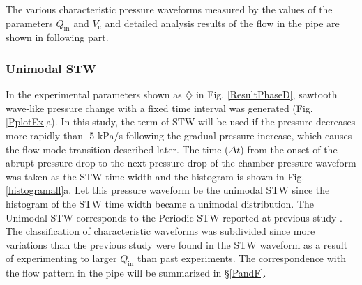 \documentclass[aps,pre,preprint,groupedaddress,showkeys]{revtex4-2}
\begin{document}
The various characteristic pressure waveforms measured by the values of the parameters $Q_\mathrm{in}$ and $V_ \mathrm{c}$ and detailed analysis results of the flow in the pipe are shown in following part.

\subsubsection{Unimodal STW}
In the experimental parameters shown as $\diamondsuit$  in Fig. \ref{ResultPhaseD}, sawtooth wave-like pressure change with a fixed time interval was generated (Fig. \ref{PplotEx}a).
In this study, the term of STW will be used if the pressure decreases more rapidly than -5 kPa/s following the gradual pressure increase, which causes the flow mode transition described later.
The time ($\Delta t$) from the onset of the abrupt pressure drop to the next pressure drop of the chamber pressure waveform was taken as the STW time width and the histogram is shown in Fig. \ref {histogramall}a.
Let this pressure waveform be the unimodal STW since the histogram of the STW time width became a unimodal distribution.
The Unimodal STW corresponds to the Periodic STW reported at previous study \citep{kanno2018}.
The classification of characteristic waveforms was subdivided since more variations than the previous study were found in the STW waveform as a result of experimenting to larger $Q_ \mathrm{in}$ than past experiments.
The correspondence with the flow pattern in the pipe will be summarized in \S \ref{PandF}.
\end{document}
